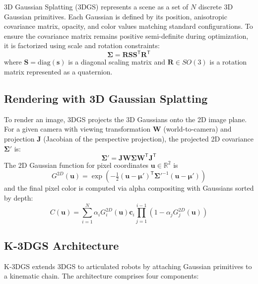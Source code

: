 \documentclass[12pt,a4paper,oneside]{report}
\begin{document}
3D Gaussian Splatting (3DGS) represents a scene as a set of $N$ discrete 3D Gaussian primitives. Each Gaussian is defined by its position, anisotropic covariance matrix, opacity, and color values matching standard configurations. To ensure the covariance matrix remains positive semi-definite during optimization, it is factorized using scale and rotation constraints:
\begin{equation}
\boldsymbol{\Sigma} = \mathbf{R} \mathbf{S} \mathbf{S}^\mathsf{T} \mathbf{R}^\mathsf{T}
\end{equation}
where $\mathbf{S} = \text{diag}(\mathbf{s})$ is a diagonal scaling matrix and $\mathbf{R} \in SO(3)$ is a rotation matrix represented as a quaternion.

\subsection{Rendering with 3D Gaussian Splatting}

\begin{sloppypar}
To render an image, 3DGS projects the 3D Gaussians onto the 2D image plane. For a given camera with viewing transformation $\mathbf{W}$ (world-to-camera) and projection $\mathbf{J}$ (Jacobian of the perspective projection), the projected 2D covariance $\boldsymbol{\Sigma}'$ is:
\begin{equation}
\boldsymbol{\Sigma}' = \mathbf{J} \mathbf{W} \boldsymbol{\Sigma} \mathbf{W}^\mathsf{T} \mathbf{J}^\mathsf{T}
\end{equation}
The 2D Gaussian function for pixel coordinates $\mathbf{u} \in \mathbb{R}^2$ is
\[
G^{2D}(\mathbf{u}) = \exp\left(-\tfrac{1}{2} (\mathbf{u} - \boldsymbol{\mu}')^\mathsf{T} \boldsymbol{\Sigma}'^{-1} (\mathbf{u} - \boldsymbol{\mu}')\right)
\]
and the final pixel color is computed via alpha compositing with Gaussians sorted by depth:
\begin{equation}
C(\mathbf{u}) = \sum_{i=1}^{N} \alpha_i G_i^{2D}(\mathbf{u}) \mathbf{c}_i \prod_{j=1}^{i-1} (1 - \alpha_j G_j^{2D}(\mathbf{u}))
\end{equation}
\end{sloppypar}

\subsection{K-3DGS Architecture}

K-3DGS extends 3DGS to articulated robots by attaching Gaussian primitives to a kinematic chain. The architecture comprises four components:
\end{document}
